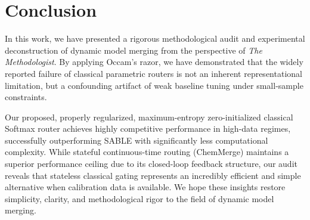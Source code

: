 \section{Conclusion}
\label{sec:conclusion}

In this work, we have presented a rigorous methodological audit and experimental deconstruction of dynamic model merging from the perspective of \emph{The Methodologist}. By applying Occam's razor, we have demonstrated that the widely reported failure of classical parametric routers is not an inherent representational limitation, but a confounding artifact of weak baseline tuning under small-sample constraints. 

Our proposed, properly regularized, maximum-entropy zero-initialized classical Softmax router achieves highly competitive performance in high-data regimes, successfully outperforming SABLE with significantly less computational complexity. While stateful continuous-time routing (ChemMerge) maintains a superior performance ceiling due to its closed-loop feedback structure, our audit reveals that stateless classical gating represents an incredibly efficient and simple alternative when calibration data is available. We hope these insights restore simplicity, clarity, and methodological rigor to the field of dynamic model merging.
